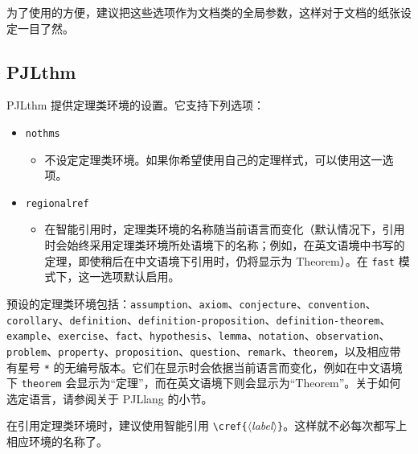 \documentclass[allowbf,regionalref]{lebhart}
\providecommand{\meta}[1]{$\langle${\normalfont\itshape#1}$\rangle$}
\newenvironment{tip}[1][提示]{%
    \begin{tcolorbox}[breakable,
        enhanced,
        width = \textwidth,
        colback = paper, colbacktitle = paper,
        colframe = gray!50, boxrule=0.2mm,
        coltitle = black,
        fonttitle = \sffamily,
        attach boxed title to top left = {yshift=-\tcboxedtitleheight/2, xshift=.5cm},
        boxed title style = {boxrule=0pt, colframe=paper},
        before skip = 0.3cm,
        after skip = 0.3cm,
        top = 3mm,
        bottom = 3mm,
        title={\scshape\sffamily #1}]%
}{\end{tcolorbox}}
\providecommand{\PJLlang}{\textsf{PJLlang}}
\providecommand{\PJLthm}{\textsf{PJLthm}}
\begin{document}
为了使用的方便，建议把这些选项作为文档类的全局参数，这样对于文档的纸张设定一目了然。

\subsection{PJLthm}

\PJLthm{} 提供定理类环境的设置。它支持下列选项：
\begin{itemize}
    \item \texttt{nothms}
    \begin{itemize}
        \item 不设定定理类环境。如果你希望使用自己的定理样式，可以使用这一选项。
    \end{itemize}
    \item \texttt{regionalref}
    \begin{itemize}
        \item 在智能引用时，定理类环境的名称随当前语言而变化（默认情况下，引用时会始终采用定理类环境所处语境下的名称；例如，在英文语境中书写的定理，即使稍后在中文语境下引用时，仍将显示为 Theorem）。在 \texttt{fast} 模式下，这一选项默认启用。
    \end{itemize}
\end{itemize}

预设的定理类环境包括：\texttt{assumption}、\texttt{axiom}、\texttt{conjecture}、\texttt{convention}、\texttt{corollary}、\texttt{definition}、\texttt{definition-proposition}、\texttt{definition-theorem}、\texttt{example}、\texttt{exercise}、\texttt{fact}、\texttt{hypothesis}、\texttt{lemma}、\texttt{notation}、\texttt{observation}、\texttt{problem}、\texttt{property}、\texttt{proposition}、\texttt{question}、\texttt{remark}、\texttt{theorem}，以及相应带有星号 \lstinline|*| 的无编号版本。它们在显示时会依据当前语言而变化，例如在中文语境下 \texttt{theorem} 会显示为“定理”，而在英文语境下则会显示为“Theorem”。关于如何选定语言，请参阅关于 \PJLlang{} 的小节。

\begin{tip}
    在引用定理类环境时，建议使用智能引用 \lstinline|\cref{|\meta{label}\lstinline|}|。这样就不必每次都写上相应环境的名称了。
\end{tip}

\medskip
\end{document}
